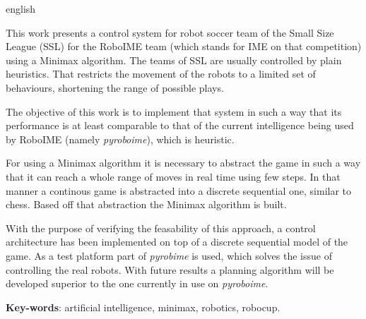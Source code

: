 \begin{resumo}[Abstract]
  \begin{otherlanguage*}{english}

    This work presents a control system for robot soccer team of the Small Size
    League (SSL) for the RoboIME team (which stands for IME on that competition)
    using a Minimax algorithm. The teams of SSL are usually controlled by plain
    heuristics. That restricts the movement of the robots to a limited set of
    behaviours, shortening the range of possible plays.

    The objective of this work is to implement that system in such a way that
    its performance is at least comparable to that of the current intelligence
    being used by RoboIME (namely \textit{pyroboime}), which is heuristic.

    For using a Minimax algorithm it is necessary to abstract the game in such a
    way that it can reach a whole range of moves in real time using few steps.
    In that manner a continous game is abstracted into a discrete sequential
    one, similar to chess. Based off that abstraction the Minimax algorithm is
    built.

    With the purpose of verifying the feasability of this approach, a control
    architecture has been implemented on top of a discrete sequential model of
    the game. As a test platform part of \textit{pyrobime} is used, which solves
    the issue of controlling the real robots. With future results a planning
    algorithm will be developed superior to the one currently in use on
    \textit{pyroboime}.


    \textbf{Key-words}: artificial intelligence, minimax, robotics, robocup.
  \end{otherlanguage*}
\end{resumo}


































